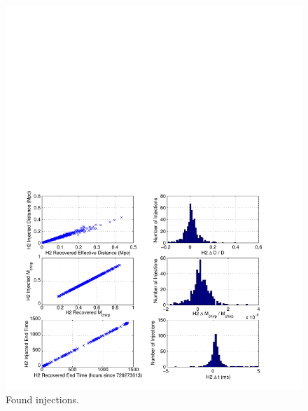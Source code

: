 \begin{figure}[p]
\begin{center}
\includegraphics[width=\textwidth]{figures/result/h2_param_error}
\end{center}
\caption{\label{f:h2_param_error}%
Found injections.
}
\end{figure}

